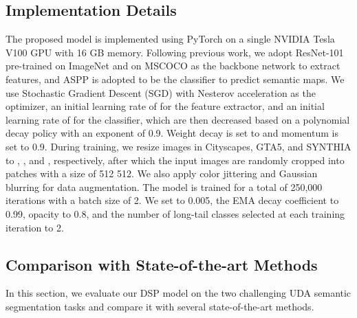 \documentclass[sigconf]{acmart}
\begin{document}
\subsection{Implementation Details}
The proposed model is implemented using PyTorch on a single NVIDIA Tesla V100 GPU with 16 GB memory. Following previous work, we adopt ResNet-101 \cite{resnet} pre-trained on ImageNet \cite{imagenet} and on MSCOCO \cite{coco} as the backbone network to extract features, and ASPP \cite{deeplabv2} is adopted to be the classifier to predict semantic maps. We use Stochastic Gradient Descent (SGD) with Nesterov acceleration as the optimizer, an initial learning rate of  for the feature extractor, and an initial learning rate of  for the classifier, which are then decreased based on a polynomial decay policy with an exponent of 0.9. Weight decay is set to  and momentum is set to 0.9. During training, we resize images in Cityscapes, GTA5, and SYNTHIA to , , and , respectively, after which the input images are randomly cropped into patches with a size of 512  512. We also apply color jittering and Gaussian blurring for data augmentation. The model is trained for a total of 250,000 iterations with a batch size of 2. We set  to 0.005, the EMA decay coefficient  to 0.99, opacity  to 0.8, and the number of long-tail classes selected at each training iteration  to 2.

\subsection{Comparison with State-of-the-art Methods}
In this section, we evaluate our DSP model on the two challenging UDA semantic segmentation tasks and compare it with several state-of-the-art methods.
\end{document}
